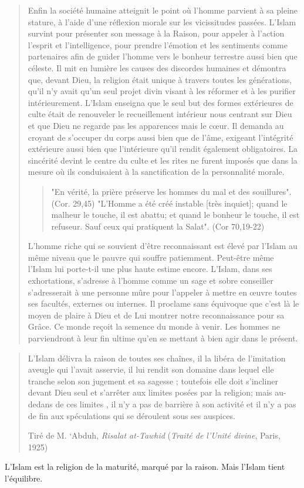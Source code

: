 \begin{quote}
Enfin la société humaine atteignit le point où l'homme parvient à sa
pleine stature, à l'aide d'une réflexion morale sur les vicissitudes
passées. L'Islam survint pour présenter son message à la Raison, pour
appeler à l'action l'esprit et l'intelligence, pour prendre l'émotion et
les sentiments comme partenaires afin de guider l'homme vers le bonheur
terrestre aussi bien que céleste. Il mit en lumière les causes des
discordes humaines et démontra que, devant Dieu, la religion était
unique à travers toutes les générations, qu'il n'y avait qu'un seul
projet divin visant à les réformer et à les purifier intérieurement.
L'Islam enseigna que le seul but des formes extérieures de culte était
de renouveler le recueillement intérieur nous centrant sur Dieu et que
Dieu ne regarde pas les apparences mais le cœur. Il demanda au croyant
de s'occuper du corps aussi bien que de l'âme, exigeant l'intégrité
extérieure aussi bien que l'intérieure qu'il rendit également
obligatoires. La sincérité devint le centre du culte et les rites ne
furent imposés que dans la mesure où ils conduisaient à la
sanctification de la personnalité morale.
\begin{quote}
    "En vérité, la prière préserve
les hommes du mal et des souillures". (Cor. 29,45) "L'Homme a été créé
instable {[}très inquiet{]}; quand le malheur le touche, il est abattu;
et quand le bonheur le touche, il est refuseur. Sauf ceux qui pratiquent
la Salat". (Cor 70,19-22) 
\end{quote} 
L'homme riche qui se souvient d'être
reconnaissant est élevé par l'Islam au même niveau que le pauvre qui
souffre patiemment. Peut-être même l'Islam lui porte-t-il une plus haute
estime encore. L'Islam, dans ses exhortations, s'adresse à l'homme comme
un sage et sobre conseiller s'adresserait à une personne mûre pour
l'appeler à mettre en œuvre toutes ses facultés, externes ou internes.
Il proclame sans équivoque que c'est là le moyen de plaire à Dieu et de
Lui montrer notre reconnaissance pour sa Grâce. Ce monde reçoit la
semence du monde à venir. Les hommes ne parviendront à leur fin ultime
qu'en se mettant à bien agir dans le présent.
\end{quote}


\begin{quote}

L'Islam délivra la raison de toutes ses chaînes, il la libéra de
l'imitation aveugle qui l'avait asservie, il lui rendit son domaine dans
lequel elle tranche selon son jugement et sa sagesse ; toutefois elle
doit s'incliner devant Dieu seul et s'arrêter aux limites posées par la
religion; mais au-dedans de ces limites , il n'y a pas de barrière à son
activité et il n'y a pas de fin aux spéculations qui se déroulent sous
ses auspices.

Tiré de M. `Abduh, \emph{Risalat at-Tawhid} (\emph{Traité de l'Unité
divine}, Paris, 1925)
\end{quote}
\begin{Synthesis}
L'Islam est la religion de la maturité, marqué par la raison. Mais l'Islam tient l'équilibre. 
\end{Synthesis}

